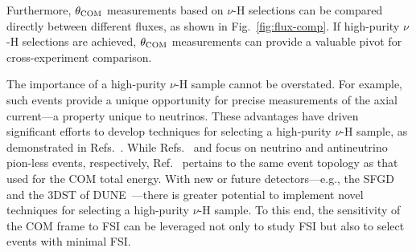      Furthermore, $\theta_{\textrm{COM}}$ measurements based on $\nu$-H selections can be compared directly between different fluxes, as shown in Fig.~\ref{fig:flux-comp}.
     If high-purity $\nu$-H selections are achieved, $\theta_{\textrm{COM}}$ measurements can provide a valuable pivot for cross-experiment comparison.

     The importance of a high-purity $\nu$-H sample cannot be overstated.
     For example, such events provide a unique opportunity for precise measurements of the axial current—a property unique to neutrinos.
     These advantages have driven significant efforts to develop techniques for selecting a high-purity $\nu$-H sample, as demonstrated in Refs.~\cite{Lu:2015hea,MINERvA:2023avz,Baudis:2023tma}.
     While Refs.~\cite{Baudis:2023tma} and \cite{MINERvA:2023avz} focus on neutrino and antineutrino pion-less events, respectively, Ref.~\cite{Lu:2015hea} pertains to the same event topology as that used for the COM total energy.
     With new or future detectors—e.g., the SFGD and the 3DST of DUNE~\cite{DUNE:2021tad}—there is greater potential to implement novel techniques for selecting a high-purity $\nu$-H sample.
     To this end, the sensitivity of the COM frame to FSI can be leveraged not only to study FSI but also to select events with minimal FSI.

